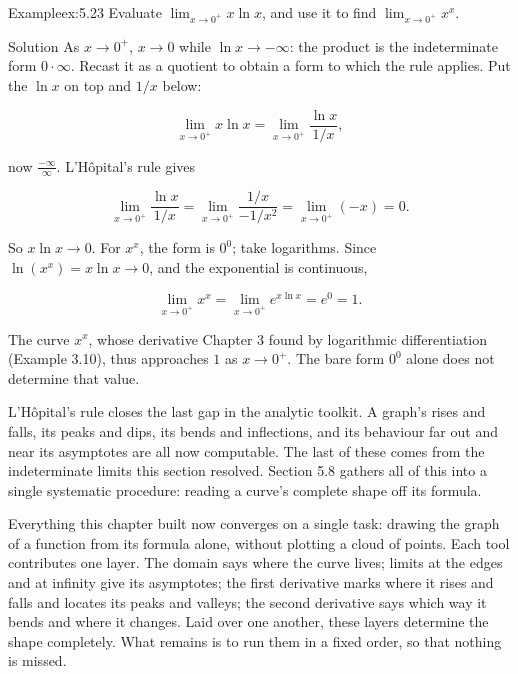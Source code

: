 \documentclass[a4paper,12pt,oneside]{memoir}
\begin{document}
\begin{workedexample}
\begin{envexample}{Example}{ex:5.23}{}
Evaluate \(\displaystyle \lim_{x \to 0^{+}} x \ln x\), and use it to find \(\displaystyle \lim_{x \to 0^{+}} x^{x}\).
\end{envexample}
\begin{envsolution}{Solution}{}{}
As \(x \to 0^{+}\), \(x \to 0\) while \(\ln x \to -\infty\): the product is the indeterminate form \(0 \cdot \infty\). Recast it as a quotient to obtain a form to which the rule applies. Put the \(\ln x\) on top and \(1/x\) below:

\[ \lim_{x \to 0^{+}} x \ln x = \lim_{x \to 0^{+}} \frac{\ln x}{1/x}, \]

now \(\tfrac{-\infty}{\infty}\). L’Hôpital’s rule gives

\[ \lim_{x \to 0^{+}} \frac{\ln x}{1/x} = \lim_{x \to 0^{+}} \frac{1/x}{-1/x^{2}} = \lim_{x \to 0^{+}} (-x) = 0. \]

So \(x \ln x \to 0\). For \(x^{x}\), the form is \(0^{0}\); take logarithms. Since \(\ln(x^{x}) = x \ln x \to 0\), and the exponential is continuous,

\[ \lim_{x \to 0^{+}} x^{x} = \lim_{x \to 0^{+}} e^{x \ln x} = e^{0} = 1. \]

The curve \(x^{x}\), whose derivative Chapter 3 found by logarithmic differentiation (Example 3.10), thus approaches \(1\) as \(x \to 0^{+}\). The bare form \(0^{0}\) alone does not determine that value. \qedmark
\end{envsolution}
\end{workedexample}
L’Hôpital’s rule closes the last gap in the analytic toolkit. A graph’s rises and falls, its peaks and dips, its bends and inflections, and its behaviour far out and near its asymptotes are all now computable. The last of these comes from the indeterminate limits this section resolved. Section 5.8 gathers all of this into a single systematic procedure: reading a curve’s complete shape off its formula.


Everything this chapter built now converges on a single task: drawing the graph of a function from its formula alone, without plotting a cloud of points. Each tool contributes one layer. The domain says where the curve lives; limits at the edges and at infinity give its asymptotes; the first derivative marks where it rises and falls and locates its peaks and valleys; the second derivative says which way it bends and where it changes. Laid over one another, these layers determine the shape completely. What remains is to run them in a fixed order, so that nothing is missed.
\end{document}
